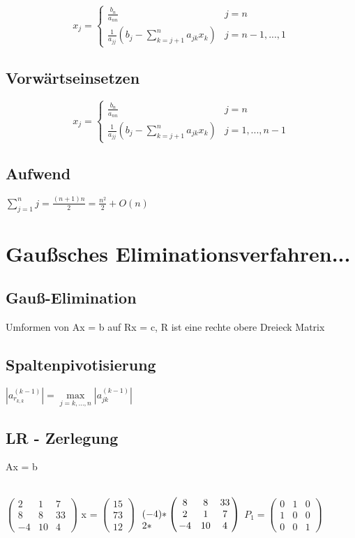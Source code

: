 \documentclass[12pt,a4paper]{article} %
\begin{document}
	\[
		x_j=\left\{
			\begin{array}{ll}
				\frac{b_n}{a_{nn}} & j = n\\
				\frac{1}{a_{jj}}(b_j - \sum\limits_{k= j + 1}^na_{jk}x_k) & j = n - 1, ..., 1
			\end{array}
		\right.
	\]
	
	\subsection{Vorwärtseinsetzen}
	
	\[
		x_j=\left\{
			\begin{array}{ll}
				\frac{b_n}{a_{nn}} & j = n\\
				\frac{1}{a_{jj}}(b_j - \sum\limits_{k= j + 1}^na_{jk}x_k) & j = 1, ..., n - 1
			\end{array}
		\right.
	\]
	
	\subsection{Aufwend}
	
	$\sum\limits_{j = 1}^nj = \frac{(n + 1)n}{2} = \frac{n^2}{2} + O(n)$
	
	\newpage
	
	\section{Gaußsches Eliminationsverfahren...}
	
	\subsection{Gauß-Elimination}
	
	Umformen von Ax = b auf Rx = c, R ist eine rechte obere Dreieck Matrix
	
	\subsection{Spaltenpivotisierung}
	
	$|a_{r_{k, k}}^{(k - 1)}| = \max\limits_{j = k, ..., n}|a_{jk}^{(k - 1)}|$
	
	\subsection{LR - Zerlegung}
	
	Ax = b
	
	$\begin{pmatrix}
		2 & 1 & 7 \\
		8 & 8 & 33 \\
		-4 & 10 & 4
	\end{pmatrix}$
	x =
	$\begin{pmatrix}
		15 \\
		73 \\
		12
	\end{pmatrix}$
	$\bordermatrix{ ~ & & & \cr
		 & 8 & 8 & 33 \cr
		(-4) * & 2 & 1 & 7 \cr
		2 * & -4 & 10 & 4
	}$
	$P_1 = \begin{pmatrix}
		0 & 1 & 0 \\
		1 & 0 & 0 \\
		0 & 0 & 1
	\end{pmatrix}$
	
\end{document}
